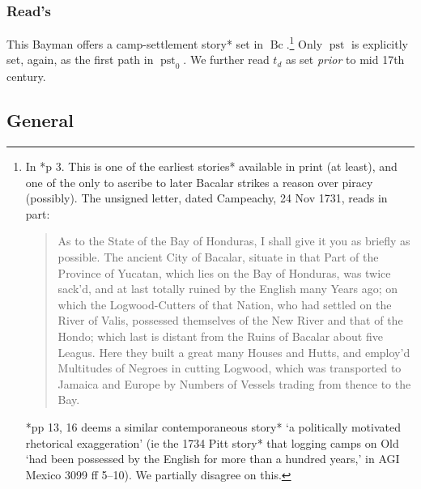 \documentclass{amsart}
\DeclareMathOperator{\bc}{Bc}%
\DeclareMathOperator{\pst}{pst}%
\theoremstyle{definition}
\theoremstyle{remark}
\begin{document}
		\subsubsection{Read's}
		\label{sss:reads} This Bayman offers a camp-settlement story* set in \(\bc\).\footnote{In \cite{rds32}*{p 3}. This is one of the earliest stories* available in print (at least), and one of the only to ascribe to later Bacalar strikes a reason over piracy (possibly). The unsigned letter, dated Campeachy, 24 Nov 1731, reads in part:\begin{quote}As to the State of the Bay of Honduras, I shall give it you as briefly as possible. The ancient City of Bacalar, situate in that Part of the Province of Yucatan, which lies on the Bay of Honduras, was twice sack'd, and at last totally ruined by the English many Years ago; on which the Logwood-Cutters of that Nation, who had settled on the River of Valis, possessed themselves of the New River and that of the Hondo; which last is distant from the Ruins of Bacalar about five Leagus. Here they built a great many Houses and Hutts, and employ'd Multitudes of Negroes in cutting Logwood, which was transported to Jamaica and Europe by Numbers of Vessels trading from thence to the Bay.\end{quote} \cite{res19}*{pp 13, 16} deems a similar contemporaneous story* `a politically motivated rhetorical exaggeration' (ie the 1734 Pitt story* that logging camps on Old `had been possessed by the English for more than a hundred years,' in AGI Mexico 3099 ff 5--10). We partially disagree on this.}%
		Only \(\pst\) is explicitly set, again, as the first path in \(\pst_0\). We further read \(t_d\) as set \emph{prior} to mid 17th century.
	\subsection{General}
		\label{ss:general}
%
%
%
\begin{bibdiv}
	\label{s:references}
	\begin{biblist}
	\end{biblist}
\end{bibdiv}
%
%
%
\end{document}
